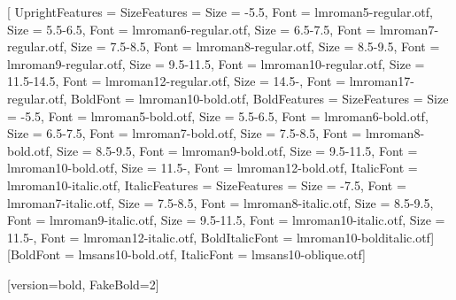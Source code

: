 \usepackage{amsmath}
\usepackage{fontspec}
\setmainfont{lmroman10-regular.otf}[
  UprightFeatures = {SizeFeatures = {
      {Size = -5.5,      Font = lmroman5-regular.otf},
      {Size = 5.5-6.5,   Font = lmroman6-regular.otf},
      {Size = 6.5-7.5,   Font = lmroman7-regular.otf},
      {Size = 7.5-8.5,   Font = lmroman8-regular.otf},
      {Size = 8.5-9.5,   Font = lmroman9-regular.otf},
      {Size = 9.5-11.5,  Font = lmroman10-regular.otf},
      {Size = 11.5-14.5, Font = lmroman12-regular.otf},
      {Size = 14.5-,     Font = lmroman17-regular.otf}}},
  BoldFont = lmroman10-bold.otf,
  BoldFeatures = {SizeFeatures = {
      {Size = -5.5,      Font = lmroman5-bold.otf},
      {Size = 5.5-6.5,   Font = lmroman6-bold.otf},
      {Size = 6.5-7.5,   Font = lmroman7-bold.otf},
      {Size = 7.5-8.5,   Font = lmroman8-bold.otf},
      {Size = 8.5-9.5,   Font = lmroman9-bold.otf},
      {Size = 9.5-11.5,  Font = lmroman10-bold.otf},
      {Size = 11.5-,     Font = lmroman12-bold.otf}}},
  ItalicFont = lmroman10-italic.otf,
  ItalicFeatures = {SizeFeatures = {
      {Size = -7.5,      Font = lmroman7-italic.otf},
      {Size = 7.5-8.5,   Font = lmroman8-italic.otf},
      {Size = 8.5-9.5,   Font = lmroman9-italic.otf},
      {Size = 9.5-11.5,  Font = lmroman10-italic.otf},
      {Size = 11.5-,     Font = lmroman12-italic.otf}}},
  BoldItalicFont = lmroman10-bolditalic.otf]
\setsansfont{lmsans10-regular.otf}[BoldFont = lmsans10-bold.otf, ItalicFont = lmsans10-oblique.otf]
\setmonofont{lmmono10-regular.otf}
\usepackage{unicode-math}
[version=bold, FakeBold=2]   %
